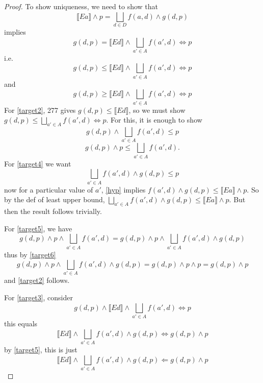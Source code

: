 \documentclass{article}
\newcommand{\lb}{\llbracket}
\newcommand{\rb}{\rrbracket}
\theoremstyle{definition}
\begin{document}
\begin{proof}
    To show uniqueness, we need to show that 
    \begin{equation}\label{hyp}
        \lb Ea \rb \wedge p = \bigsqcup_{d \in D} f(a, d) \wedge g(d, p)
    \end{equation}
    implies 
    \begin{equation}\label{target1}
        g(d, p) = \lb Ed \rb \wedge \bigsqcup_{a' \in A} f(a', d) \Leftrightarrow p 
    \end{equation}
    i.e.
    \begin{equation}\label{target2}
        g(d, p) \leq \lb Ed \rb \wedge \bigsqcup_{a' \in A} f(a', d) \Leftrightarrow p 
    \end{equation}
    and 
    \begin{equation}\label{target3}
        g(d, p) \geq \lb Ed \rb \wedge \bigsqcup_{a' \in A} f(a', d) \Leftrightarrow p 
    \end{equation}
    For \eqref{target2}, 277 gives $g(d, p) \leq \lb Ed \rb$, so we must show $g(d,p) \leq \bigsqcup_{a' \in A} f(a', d) \Leftrightarrow p$.
    For this, it is enough to show
    \begin{equation}\label{target4}
        g(d,p) \wedge \bigsqcup_{a' \in A} f(a', d) \leq p 
    \end{equation}
    \begin{equation}\label{target5}
        g(d,p) \wedge p \leq \bigsqcup_{a' \in A} f(a', d).
    \end{equation}
    For \eqref{target4} we want 
    \begin{equation}\label{target6}
         \bigsqcup_{a' \in A} f(a', d) \wedge g(d, p) \leq p 
    \end{equation}
    now for a particular value of $a'$, \eqref{hyp} implies $f(a', d) \wedge g(d, p) \leq \lb Ea \rb \wedge p$.
    So by the def of least upper bound, $\bigsqcup_{a' \in A} f(a', d) \wedge g(d, p) \leq \lb Ea \rb \wedge p$. But
    then the result follows trivially.

    For \eqref{target5}, we have 
    \[
        g(d,p) \wedge p \wedge \bigsqcup_{a' \in A} f(a', d) =  g(d,p) \wedge p \wedge \bigsqcup_{a' \in A} f(a', d) \wedge g(d, p)
    \]
    thus by \eqref{target6}
    \[
        g(d,p) \wedge p \wedge \bigsqcup_{a' \in A} f(a', d) \wedge g(d, p) = g(d,p) \wedge p \wedge p = g(d,p) \wedge p
    \]
    and \eqref{target2} follows.

    For \eqref{target3}, consider
    \begin{equation}
        g(d, p) \wedge \lb Ed \rb \wedge \bigsqcup_{a' \in A} f(a', d) \Leftrightarrow p 
    \end{equation}
    this equals 
    \begin{equation}
        \lb Ed \rb \wedge \bigsqcup_{a' \in A} f(a', d) \wedge g(d, p) \Leftrightarrow g(d, p) \wedge p 
    \end{equation}
    by \eqref{target5}, this is just
    \begin{equation}
        \lb Ed \rb \wedge \bigsqcup_{a' \in A} f(a', d) \wedge g(d, p) \Leftarrow g(d, p) \wedge p 
    \end{equation}
\end{proof}
\newpage
\end{document}
